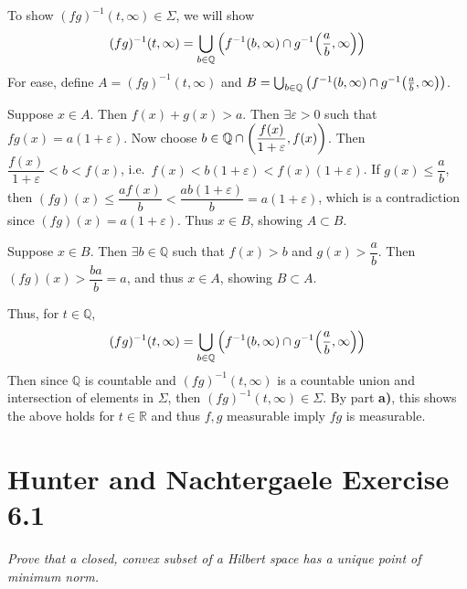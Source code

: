 \documentclass[12pt]{article}
\newcommand{\E}{\varepsilon}
\theoremstyle{plain}
\begin{document}
To show $(fg)^{-1}(t, \infty) \in \Sigma$, we will show
\begin{align*}
    (fg)^{-1}(t, \infty) = \bigcup_{b \in \mathbb{Q}}\qty(f^{-1}(b, \infty)\cap g^{-1}\qty(\frac{a}{b}, \infty))
\end{align*}
For ease, define $A = (fg)^{-1}(t, \infty)$ and $B = \bigcup_{b \in \mathbb{Q}}\qty(f^{-1}(b, \infty)\cap g^{-1}\qty(\frac{a}{b}, \infty))$.

Suppose $x \in A$.  Then $f(x) + g(x) > a$.  Then $\exists \E > 0$ such that $fg(x) = a(1 + \E)$.  Now choose $b \in \mathbb{Q}\cap\qty(\dfrac{f(x)}{1 + \E}, f(x))$.  Then $\dfrac{f(x)}{1 + \E} < b < f(x)$, i.e.~$f(x) < b(1 + \E) < f(x)(1 + \E)$.  If $g(x) \leq \dfrac{a}{b}$, then $(fg)(x) \leq \dfrac{af(x)}{b} < \dfrac{ab(1 + \E)}{b} = a(1 + \E)$, which is a contradiction since $(fg)(x) = a(1 + \E)$.  Thus $x \in B$, showing $A \subset B$.

Suppose $x \in B$.  Then $\exists b \in \mathbb{Q}$ such that $f(x) > b$ and $g(x) > \dfrac{a}{b}$.  Then $(fg)(x) > \dfrac{ba}{b} = a$, and thus $x \in A$, showing $B \subset A$.

Thus, for $t \in \mathbb{Q}$,
\begin{align*}
    (fg)^{-1}(t, \infty) = \bigcup_{b \in \mathbb{Q}}\qty(f^{-1}(b, \infty)\cap g^{-1}\qty(\frac{a}{b}, \infty))
\end{align*}
Then since $\mathbb{Q}$ is countable and $(fg)^{-1}(t, \infty)$ is a countable union and intersection of elements in $\Sigma$, then $(fg)^{-1}(t, \infty) \in \Sigma$.  By part \textbf{a)}, this shows the above holds for $t \in \mathbb{R}$ and thus $f, g$ measurable imply $fg$ is measurable.

\section*{Hunter and Nachtergaele Exercise 6.1}
\emph{Prove that a closed, convex subset of a Hilbert space has a unique point of minimum norm.} \\
\end{document}
